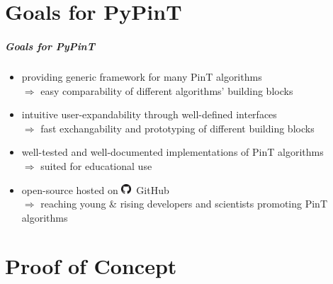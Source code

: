 \documentclass[%
  english,
  hyperref={pdfpagelabels=false},
  aspectratio=1610]{beamer}
\begin{document}
\part{Goals for PyPinT}
\makepart

\begin{frame}
  \frametitle{Goals for PyPinT}
  
  \begin{itemize}
    \item<1-> providing generic framework for many PinT algorithms\\
      {\color{fzjblue50}$\Rightarrow$ easy comparability of different algorithms' building blocks\\[1.5em]}
    \item<3-> intuitive user-expandability through well-defined interfaces\\
      {\color{fzjblue50}$\Rightarrow$ fast exchangability and prototyping of different building blocks\\[1.5em]}
    \item<5-> well-tested and well-documented implementations of PinT algorithms\\
      {\color{fzjblue50}$\Rightarrow$ suited for educational use\\[1.5em]}
    \item<7-> open-source hosted on \includegraphics[height=1em]{src/GitHub-Mark-32px.png}~GitHub\\
      {\color{fzjblue50}$\Rightarrow$ reaching young \& rising developers and scientists promoting PinT algorithms\\[1.5em]}
  \end{itemize}
\end{frame}


\part{Proof of Concept}
\makepart
\end{document}
